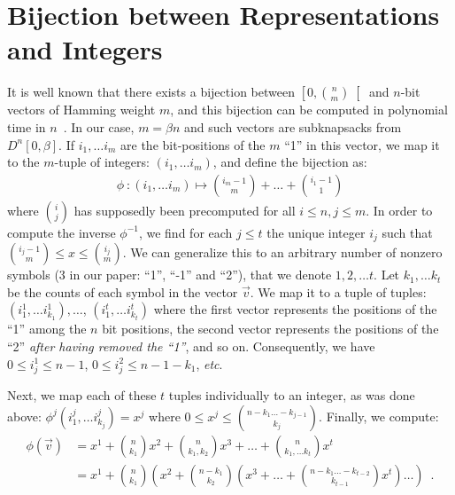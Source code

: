 
\section{Bijection between Representations and Integers}
\label{appendix:rpbijection}

It is well known
that there exists a bijection between $\left[0, {n \choose m} \right[$ and $n$-bit vectors of Hamming weight $m$, and this bijection can be computed in polynomial time in $n$~\cite{ch72}. In our case, $m = \beta n$ and such vectors are subknapsacks from $D^n[0, \beta]$. If $i_1, \ldots i_{m}$ are the bit-positions of the $m$ ``1'' in this vector, we map it to the $m$-tuple of integers: $(i_1, \ldots i_{m})$, and define the bijection as:
\begin{align*}
\phi~: (i_1, \ldots i_{m}) \mapsto {i_{m} - 1 \choose {m}} + \ldots + {i_1 - 1 \choose {1}}
\end{align*}
where ${i \choose {j}}$ has supposedly been precomputed for all $i \leq n, j \leq m$. In order to compute the inverse $\phi^{-1}$, we find for each $j \leq t$ the unique integer $i_j$ such that ${i_{j} - 1 \choose {m}} \leq x \leq {i_{j} \choose {m}}$.
We can generalize this to an arbitrary number of nonzero symbols (3 in our paper: ``1'', ``-1'' and ``2''), that we denote $1, 2, \ldots t$.  Let $k_1, \ldots k_t$ be the counts of each symbol in the vector $\vec{v}$. We map it to a tuple of tuples: $ (i^1_1, \ldots i^1_{k_1}), \ldots$, $(i^t_1, \ldots i^t_{k_t}) $
where the first vector represents the positions of the ``1'' among the $n$ bit positions, the second vector represents the positions of the ``2'' \emph{after having removed the ``1''}, and so on. Consequently, we have $0 \leq i^1_{j} \leq n-1$, $0 \leq i^2_{j} \leq n-1 - k_1$, \emph{etc}.

Next, we map each of these $t$ tuples individually to an integer, as was done above: $\phi^j (i^j_1, \ldots i^j_{k_j}) = x^j$ where $0 \leq x^j \leq {n - k_1 \ldots -k_{j-1} \choose k_j }$. Finally, we compute:
\begin{align*}
\phi(\vec{v}) &= x^1 + {n \choose k_1} x^2 + {n \choose k_1, k_2} x^3 + \ldots + {n \choose k_1, \ldots k_t} x^t \\
&= x^1 + {n \choose k_1} \left( x^2 + {n - k_1 \choose k_2} \left( x^3 + \ldots + {n - k_1 \ldots -k_{t-2} \choose k_{t-1} } x^t\right) \ldots \right) \enspace.
\end{align*}

